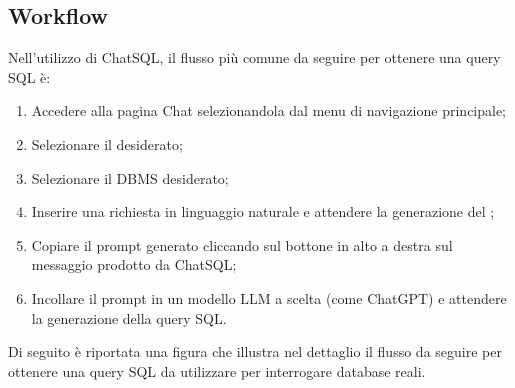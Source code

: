 \subsection{Workflow}
\par Nell'utilizzo di ChatSQL, il flusso più comune da seguire per ottenere una query SQL è:
\begin{enumerate}
  \item Accedere alla pagina Chat selezionandola dal menu di navigazione principale;
  \item Selezionare il  desiderato;
  \item Selezionare il DBMS desiderato;
  \item Inserire una richiesta in linguaggio naturale e attendere la generazione del ;
  \item Copiare il prompt generato cliccando sul bottone in alto a destra sul messaggio prodotto da ChatSQL;
  \item Incollare il prompt in un modello LLM a scelta (come ChatGPT) e attendere la generazione della query SQL.
\end{enumerate}

\vspace{0.5\baselineskip}
\par Di seguito è riportata una figura che illustra nel dettaglio il flusso da seguire per ottenere una query SQL da utilizzare per interrogare database reali.

